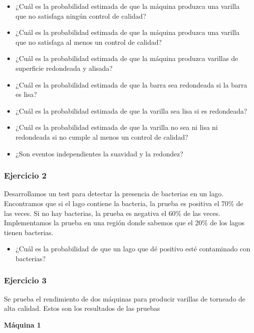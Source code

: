 \documentclass[
]{book}
\providecommand{\tightlist}{%
  \setlength{\itemsep}{0pt}\setlength{\parskip}{0pt}}
\begin{document}
\begin{itemize}
\item
  ¿Cuál es la probabilidad estimada de que la máquina produzca una varilla que no satisfaga ningún control de calidad?
\item
  ¿Cuál es la probabilidad estimada de que la máquina produzca una varilla que no satisfaga al menos un control de calidad?
\item
  ¿Cuál es la probabilidad estimada de que la máquina produzca varillas de superficie redondeada y alisada?
\item
  ¿Cuál es la probabilidad estimada de que la barra sea redondeada si la barra es lisa?
\item
  ¿Cuál es la probabilidad estimada de que la varilla sea lisa si es redondeada?
\item
  ¿Cuál es la probabilidad estimada de que la varilla no sea ni lisa ni redondeada si no cumple al menos un control de calidad?
\item
  ¿Son eventos independientes la suavidad y la redondez?
\end{itemize}

\hypertarget{ejercicio-2-2}{%
\subsubsection{Ejercicio 2}\label{ejercicio-2-2}}

Desarrollamos un test para detectar la presencia de bacterias en un lago. Encontramos que si el lago contiene la bacteria, la prueba es positiva el 70\% de las veces. Si no hay bacterias, la prueba es negativa el 60\% de las veces. Implementamos la prueba en una región donde sabemos que el 20\% de los lagos tienen bacterias.

\begin{itemize}
\tightlist
\item
  ¿Cuál es la probabilidad de que un lago que dé positivo esté contaminado con bacterias?
\end{itemize}

\hypertarget{ejercicio-3}{%
\subsubsection{Ejercicio 3}\label{ejercicio-3}}

Se prueba el rendimiento de dos máquinas para producir varillas de torneado de alta calidad. Estos son los resultados de las pruebas

\textbf{Máquina 1}
\end{document}
